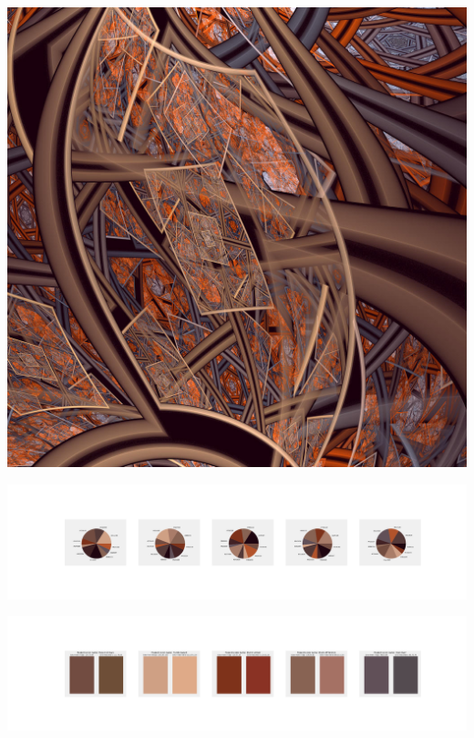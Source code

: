 \documentclass[11pt]{article}
\begin{document}
\begin{landscape}
    \begin{center}
    \includegraphics[width=\textwidth]{./nbimg/file (238).jpg}
    \end{center}

    \begin{center}
    \includegraphics[width=250mm]{./nbimg/pie-154.jpg}
    \end{center}

    \begin{center}
    \includegraphics[width=250mm]{./nbimg/peak-154.jpg}
    \end{center}
    


\end{landscape}
\end{document}
